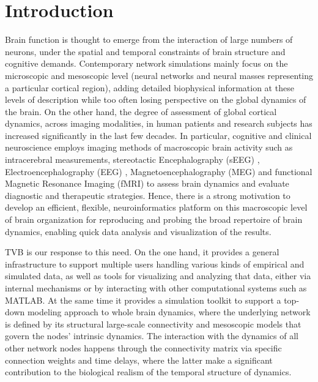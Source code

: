 \documentclass{bioinfo}
\begin{document}

\section{Introduction}
    
    Brain function is thought to emerge from the interaction of large numbers
    of neurons, under the spatial and temporal constraints of brain structure
    and cognitive demands. Contemporary network simulations mainly focus on
    the microscopic and mesoscopic level (neural networks and neural masses
    representing a particular cortical region), adding detailed biophysical
    information at these levels of description while too often losing
    perspective on the global dynamics of the brain. On the other hand, the
    degree of  assessment of global cortical dynamics,  across imaging
    modalities, in human patients and research subjects has  increased
    significantly in the last few decades. In particular, cognitive and
    clinical neuroscience employs imaging methods of macroscopic brain
    activity such as intracerebral measurements, stereotactic Encephalography
    (sEEG) \citep{Ellenrieder_2012}, Electroencephalography (EEG) 
    \citep{Nunez_1981book, Nunez_1995book, Niedermeyer_2005}, 
    Magnetoencephalography (MEG) \citep{Haemaelaeinen_1992, Haemaelaeinen_1993, 
    Mosher_1999} and
    functional Magnetic  Resonance Imaging (fMRI) \citep{Ogawa_1993, Ogawa_1998, 
    Logothetis_2001} to assess brain dynamics and
    evaluate diagnostic  and therapeutic strategies. Hence, there is a strong
    motivation to develop  an efficient, flexible, neuroinformatics platform
    on this macroscopic level of brain organization for reproducing and
    probing the broad repertoire of  brain dynamics, enabling quick data
    analysis and visualization of the  results.
    
    TVB is our response to this need. On the one hand, it
    provides a general infrastructure to support multiple users handling
    various kinds of empirical and simulated data, as well as tools for
    visualizing and analyzing that data, either via internal mechanisms or by
    interacting with other computational systems such as MATLAB. At the same
    time it provides a simulation toolkit to support a top-down modeling
    approach to whole brain dynamics, where the underlying network is defined
    by its structural large-scale connectivity and mesoscopic models that govern
    the nodes' intrinsic dynamics. The interaction with the dynamics of all
    other network nodes happens through the connectivity matrix via specific
    connection weights and time delays, where the latter make a significant
    contribution to the biological realism of the temporal structure of
    dynamics.
    
\end{document}

